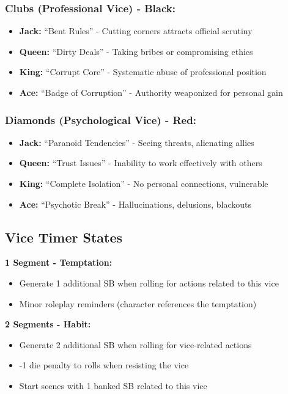 \documentclass[11pt]{article}
\begin{document}
\subsubsection{Clubs (Professional Vice) - Black:}
\begin{itemize}
    \item \textbf{Jack:} ``Bent Rules'' - Cutting corners attracts official scrutiny
    \item \textbf{Queen:} ``Dirty Deals'' - Taking bribes or compromising ethics
    \item \textbf{King:} ``Corrupt Core'' - Systematic abuse of professional position
    \item \textbf{Ace:} ``Badge of Corruption'' - Authority weaponized for personal gain
\end{itemize}

\subsubsection{Diamonds (Psychological Vice) - Red:}
\begin{itemize}
    \item \textbf{Jack:} ``Paranoid Tendencies'' - Seeing threats, alienating allies
    \item \textbf{Queen:} ``Trust Issues'' - Inability to work effectively with others
    \item \textbf{King:} ``Complete Isolation'' - No personal connections, vulnerable
    \item \textbf{Ace:} ``Psychotic Break'' - Hallucinations, delusions, blackouts
\end{itemize}

\subsection{Vice Timer States}

\textbf{1 Segment - Temptation:}
\begin{itemize}
    \item Generate 1 additional SB when rolling for actions related to this vice
    \item Minor roleplay reminders (character references the temptation)
\end{itemize}

\textbf{2 Segments - Habit:}
\begin{itemize}
    \item Generate 2 additional SB when rolling for vice-related actions
    \item -1 die penalty to rolls when resisting the vice
    \item Start scenes with 1 banked SB related to this vice
\end{itemize}
\end{document}

